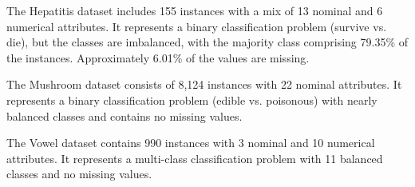 The Hepatitis dataset includes 155 instances with a mix of 13 nominal and 6 numerical attributes. It represents a binary classification problem (survive vs. die), but the classes are imbalanced, with the majority class comprising 79.35\% of the instances. Approximately 6.01\% of the values are missing. 

The Mushroom dataset consists of 8,124 instances with 22 nominal attributes. It represents a binary classification problem (edible vs. poisonous) with nearly balanced classes and contains no missing values. 

The Vowel dataset contains 990 instances with 3 nominal and 10 numerical attributes. It represents a multi-class classification problem with 11 balanced classes and no missing values. 





    
